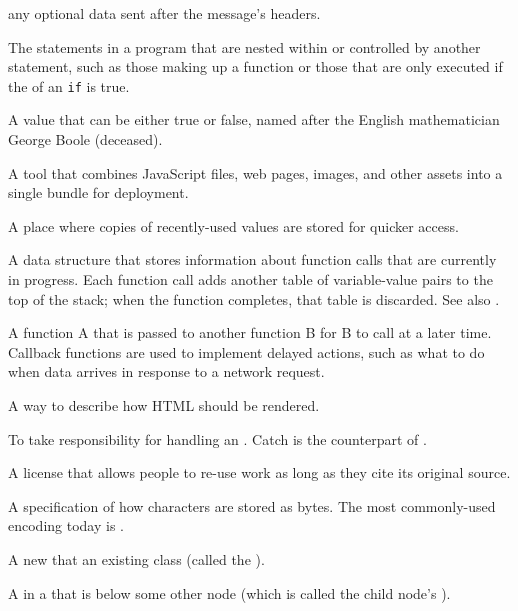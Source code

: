 \begin{description}
any optional data sent after the message's headers.

The statements in a program that are nested within or controlled by another statement,
such as those making up a function or those that are only executed
if the  of an \texttt{if} is true.

A value that can be either true or false,
named after the English mathematician George Boole (deceased).

A tool that combines JavaScript files, web pages, images, and other assets
into a single bundle for deployment.

A place where copies of recently-used values are stored for quicker access.

A data structure that stores information about function calls that are
currently in progress. Each function call adds another table of
variable-value pairs to the top of the stack; when the function completes,
that table is discarded. See also .

A function A that is passed to another function B for B to call at a later
time. Callback functions are used to implement delayed actions, such as what
to do when data arrives in response to a network request.

A way to describe how HTML should be rendered.

To take responsibility for handling an .
Catch is the counterpart of .

A license that allows people to re-use work as long as they cite its
original source.

A specification of how characters are stored as bytes. The most commonly-used
encoding today is .

A new  that  an existing class (called
the ).

A  in a  that is below some other node (which is
called the child node's ).


\end{description}
